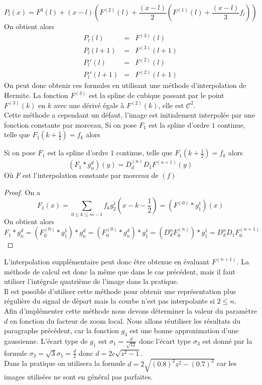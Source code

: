 \begin{equation*}
P_l (x)=F^{3}(l) +(x-l) \left(F^{(2)}(l)+ \frac{(x-l)}{2}\left(F^{(1)}(l)+\frac{(x-l)}{3} f_{l}\right)\right)
\end{equation*}
On obtient alors
\begin{eqnarray*}
P_l (l) &=& F^{(3)}(l) \\
P_l (l+1) &=& F^{(3)}(l+1) \\
P_l '(l) &=& F^{(2)}(l) \\
P_l '(l+1) &=& F^{(2)}(l+1)
\end{eqnarray*}
On peut donc obtenir ces formules en utilisant une méthode d'interpolation de Hermite. La fonction $F^{(3)}$ est la spline de cubique passant par le point $F^{(3)}(k)$ en $k$ avec une dérivé égale à $F^{(2)}(k)$, elle est $\mathcal{C}^2$.\\
Cette méthode a cependant un défaut, l'image est initialement interpolée par une fonction constante par morceau, Si on pose $F_1$  est la spline d'ordre $1$ continue, telle que $F_{1}(k+\frac{1}{2})=f_k$ alors
\begin{prop} Si on pose $F_1$  est la spline d'ordre $1$ continue, telle que $F_{1}(k+\frac{1}{2})=f_k$ alors 
\begin{equation*}
( F_1 * g_n^d ) (y) = D_d^{(n)}D_1 F^{(n+1)}(y)
\end{equation*}
Où $F$ est l'interpolation constante par morceau de $(f)$
\end{prop}
\begin{proof}
On a
\begin{equation*}
F_1(x)=\underset{0\le k \le m-1}{\sum} f_k g_2^1 (x-k-\frac{1}{2})=(F^{(0)} *g_1^1 )(x)
\end{equation*}
On obtient alors 
\begin{equation*}
F_1*g_n^d=(F_0 ^{(0)}*g_1^1)*g_n^d=(F_0 ^{(0)}*g_n^d)*g_1^1=(D_d^n F_0 ^{(n)})*g_1^1= D_d^n D_1 F_0^{(n+1)}
\end{equation*}
\end{proof}
L'interpolation supplémentaire peut donc être obtenue en évaluant $F^{(n+1)}$. La méthode de calcul est donc la même que dans le cas précédent, mais il faut utiliser l'intégrale quatrième de l'image dans la pratique.\\
Il est possible d'utiliser cette méthode pour obtenir une représentation plus régulière du signal de départ mais la courbe n'est pas  interpolante si $2\le n$.\\
Afin d'implémenter cette méthode nous devons déterminer la valeur du paramètre $d$ en fonction du facteur de zoom local. Nous allons réutiliser les résultats du paragraphe précédent, car la fonction $g_3$ est une bonne approximation d'une gaussienne. L'écart type de $g_1$ est $\sigma_1=\frac{d}{\sqrt{12}}$ donc l'écart type $\sigma_3$ est donné par la formule $\sigma_3=\sqrt{3}\sigma_1=\frac{d}{2}$
donc $d=2c\sqrt{z^2 - 1}$.\\
Dans la pratique on utilisera la formule $d=2\sqrt{(0.8)^2 z^2 - (0.7)^2}$ car les images utilisées ne sont en général pas parfaites.\\

